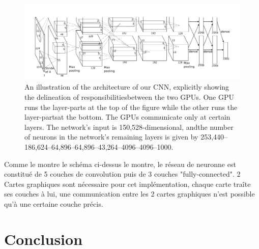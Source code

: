 \documentclass[12pt, letterpaper]{article}
\begin{document}
\begin{figure}[H]
    \includegraphics[width=\linewidth]{img/fig7.png}
    \caption{An illustration of the architecture of our CNN, explicitly showing the delineation of responsibilitiesbetween the two GPUs. One GPU runs the layer-parts at the top of the figure while the other runs the layer-partsat the bottom. The GPUs communicate only at certain layers. The network’s input is 150,528-dimensional, andthe number of neurons in the network’s remaining layers is given by 253,440–186,624–64,896–64,896–43,264–4096–4096–1000.}
    \label{fig:L7}
\end{figure}
Comme le montre le schéma ci-dessus le montre, le réseau de neuronne est constitué de 5 couches de convolution puis de 3 couches "fully-connected".
2 Cartes graphiques sont nécessaire pour cet implémentation, chaque carte traîte ses couches à lui, une communication entre les 2 cartes graphiques n'est 
possible qu'à une certaine couche précis. 

\section{Conclusion}

\newpage
\printbibliography
\end{document}
